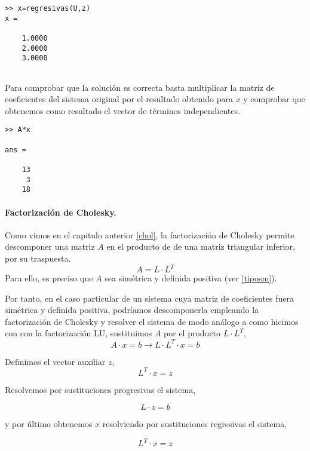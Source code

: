 \begin{verbatim}
>> x=regresivas(U,z)
x =

    1.0000
    2.0000
    3.0000


\end{verbatim}
Para comprobar que la solución es correcta basta multiplicar la matriz de coeficientes del sistema original por el resultado obtenido para $x$ y comprobar que obtenemos como resultado el vector de términos independientes.
\begin{verbatim}
>> A*x

ans =

    13
     3
    18
\end{verbatim}
 
\paragraph{Factorización de Cholesky.} Como vimos en el capitulo anterior \ref{chol}, la factorización de Cholesky permite descomponer una matriz $A$ en el producto de de una matriz triangular inferior, por su traspuesta. 
\begin{equation*}
A=L\cdot L^T
\end{equation*}
Para ello, es preciso que $A$ sea simétrica y definida positiva (ver \ref{tiposm}). 

Por tanto, en el caso particular de un sistema cuya matriz de coeficientes fuera simétrica y definida positiva, podríamos descomponerla empleando la factorización de Cholesky y resolver el sistema de modo análogo a como hicimos con con la factorización LU, sustituimos $A$ por el producto $L\cdot L^T$,
\begin{equation*}
A\cdot x = b \rightarrow L\cdot L^T\cdot x= b
\end{equation*}

Definimos el vector auxiliar $z$,
\begin{equation*}
L^T\cdot x= z
\end{equation*}

Resolvemos por sustituciones progresivas el sistema,

\begin{equation*}
L\cdot z=b
\end{equation*}

y por último obtenemos $x$ resolviendo por sustituciones regresivas el sistema,

\begin{equation*}
L^T\cdot x=z
\end{equation*}

